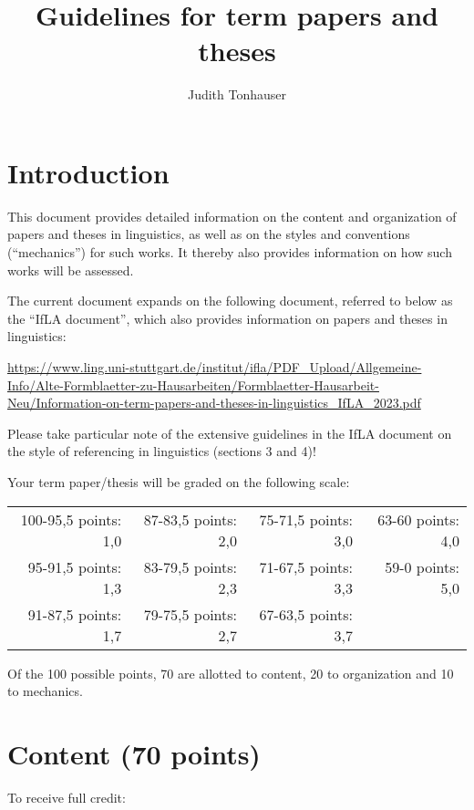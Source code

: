 \documentclass[11pt,fleqn,a4paper/thesis]{article}
\title{Guidelines for term papers and theses}
\author{Judith Tonhauser}
\affil{University of Stuttgart}
\newcommand{\6}{\mbox{$[\hspace*{-.6mm}[$}}
\newcommand{\9}{\mbox{$]\hspace*{-.6mm}]$}}
\begin{document}
\maketitle

\section{Introduction}

This document provides detailed information on the content and organization of papers and theses in linguistics, as well as on the styles and conventions (``mechanics'') for such works. It thereby also provides information on how such works will be assessed. 

The current document expands on the following document, referred to below as the ``IfLA document'', which also provides information on papers and theses in linguistics: 

\url{https://www.ling.uni-stuttgart.de/institut/ifla/PDF_Upload/Allgemeine-Info/Alte-Formblaetter-zu-Hausarbeiten/Formblaetter-Hausarbeit-Neu/Information-on-term-papers-and-theses-in-linguistics_IfLA_2023.pdf}

Please take particular note of the extensive guidelines in the IfLA document on the style of referencing in linguistics (sections 3 and 4)!

Your term paper/thesis will be graded on the following scale: 

\setlength{\tabcolsep}{20pt}
\begin{tabular}{rrrr}
100-95,5 points: 1,0 & 87-83,5 points: 2,0 & 75-71,5 points: 3,0 & 63-60 points: 4,0  \\ 
95-91,5 points: 1,3 & 83-79,5 points: 2,3  & 71-67,5 points: 3,3 & 59-0 points: 5,0 \\
91-87,5 points: 1,7 & 79-75,5 points: 2,7 & 67-63,5 points: 3,7 & \\
\end{tabular}

Of the 100 possible points, 70 are allotted to content, 20 to organization and 10 to mechanics.

\section{Content (70 points)}

To receive full credit:
\end{document}
